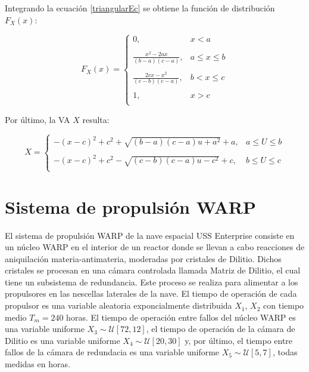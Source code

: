 \documentclass{sig-alternate}
\begin{document}
Integrando la ecuaci\'{o}n \ref{triangularEc} se obtiene la funci\'{o}n de 
distribuci\'{o}n $F_{X}(x)$:

\begin{equation}
\label{triangularIntegrada}
F_{X}(x) = 
    \begin{cases}
    0, & x < a\\
     \ \\
    \frac{x^{2} - 2ax}{(b-a)(c-a)}, &  a \le x \le b\\
     \ \\
    \frac{2cx - x^{2}}{(c-b)(c-a)}, & b < x \le c\\
     \ \\
     1, & x > c\\
    \end{cases}
\end{equation}

Por \'{u}ltimo, la VA $X$ resulta:

\begin{equation}
\label{vaconftriangular}
X = 
    \begin{cases}
    -(x-c)^2 + c ^2 + \sqrt{(b-a)(c-a)u + a^2} + a, & a \leq U \leq b \\
    \ \\
    -(x-c)^2 + c ^2 - \sqrt{(c-b)(c-a)u - c^2} + c, & b \le U \leq c \\
    \end{cases}
\end{equation}


\section{Sistema de propulsi\'{o}n WARP}\label{simulacionpropulsor}
El sistema de propulsi\'on WARP de la nave espacial USS Enterprise consiste en un n\'ucleo WARP
en el interior de un reactor donde se llevan a cabo reacciones de aniquilaci\'on 
materia-antimateria, moderadas por cristales de Dilitio. Dichos cristales se
procesan en una c\'amara controlada llamada Matriz de Dilitio, el cual tiene
un subsistema de redundancia. Este proceso se realiza para alimentar a los 
propulsores en las nescellas laterales de la nave. El tiempo de operaci\'on de 
cada propulsor es una variable aleatoria exponcialmente distribuida $X_1$,  $X_2$ 
con tiempo medio $T_m = 240$ horas. El tiempo de operaci\'on entre fallos del n\'ucleo 
WARP es una variable uniforme $X_3 \sim \mathcal{U}[72,12]$, el tiempo de operaci\'on 
de la c\'amara de Dilitio es una variable uniforme $X_4 \sim \mathcal{U}[20,30]$ y, por 
\'ultimo, el tiempo entre fallos de la c\'amara de redundacia es una variable uniforme 
$X_5 \sim \mathcal{U}[5,7]$, todas medidas en horas.
\end{document}
